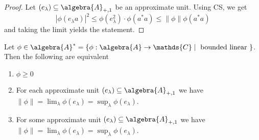 \documentclass[a4paper]{article}
\begin{document}
\begin{proof}
	Let $(e_\lambda) \subseteq \algebra{A}_{+, 1}$ be an approximate unit.
	Using CS, we get
	\begin{equation*}
		|\phi(e _\lambda a) |^2 \leq \phi(e_\lambda^2) \cdot \phi(a^* a) \leq \|\phi\| \phi(a^* a)
	\end{equation*}
	and taking the limit yields the statement.
\end{proof}

\begin{theorem}
	Let $\phi \in \algebra{A}^* = \{ \phi: \algebra{A} \to \mathds{C} \mid \text{ bounded linear } \}$.
	Then the following are equivalent
	\begin{enumerate}
		\item $\phi \geq 0$
		\item For each approximate unit $(e_\lambda) \subseteq \algebra{A}_{+, 1}$ we have $\|\phi\| = \lim_\lambda \phi(e_\lambda) = \sup_\lambda \phi(e_\lambda)$.
		\item For some approximate unit $(e_\lambda) \subseteq \algebra{A}_{+, 1}$ we have $\|\phi\| = \lim_\lambda \phi(e_\lambda) = \sup_\lambda \phi(e_\lambda)$.
	\end{enumerate}
\end{theorem}
\end{document}
